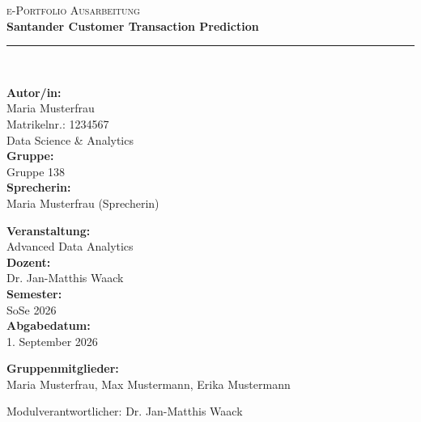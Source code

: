 \documentclass[11pt,a4paper]{article}
\newcommand{\thethema}{Santander Customer Transaction Prediction}
\newcommand{\theautor}{Maria Musterfrau}
\newcommand{\thematrikelnr}{1234567}
\newcommand{\thestudiengang}{Data Science \& Analytics}
\newcommand{\themodul}{Advanced Data Analytics}
\newcommand{\thedozent}{Dr. Jan-Matthis Waack}
\newcommand{\thesemester}{SoSe 2026}
\newcommand{\theabgabedatum}{1. September 2026}
\newcommand{\thegruppennummer}{138}
\newcommand{\thesprecherin}{Maria Musterfrau (Sprecherin)}
\newcommand{\themitglieder}{Maria Musterfrau, Max Mustermann, Erika Mustermann}
\begin{document}
\begin{titlepage}
    \thispagestyle{empty}
    \centering
    \vspace*{1cm}
    
    {\Large\scshape\color{secondary} e-Portfolio Ausarbeitung}\\[0.5cm]
    {\huge\bfseries\color{primary} \thethema}\\[1.5cm]
    
    \rule{\linewidth}{1pt}\\[1cm]
    
    \begin{minipage}{0.48\textwidth}
        \begin{flushleft} \large
            \textbf{Autor/in:}\\
            \theautor\\
            Matrikelnr.: \thematrikelnr\\
            \thestudiengang\\[0.5cm]
            
            \textbf{Gruppe:}\\
            Gruppe \thegruppennummer\\[0.2cm]
            \textbf{Sprecherin:}\\
            \thesprecherin
        \end{flushleft}
    \end{minipage}
    \begin{minipage}{0.48\textwidth}
        \begin{flushright} \large
            \textbf{Veranstaltung:}\\
            \themodul\\[0.3cm]
            \textbf{Dozent:}\\
            \thedozent\\[0.3cm]
            \textbf{Semester:}\\
            \thesemester\\[0.3cm]
            \textbf{Abgabedatum:}\\
            \theabgabedatum
        \end{flushright}
    \end{minipage}
    
    \vfill
    
{\large
        \textbf{Gruppenmitglieder:}\\[0.2cm]
        \themitglieder
    }
    
    \vfill
    {\small Modulverantwortlicher: Dr. Jan-Matthis Waack}
\end{titlepage}
\end{document}
